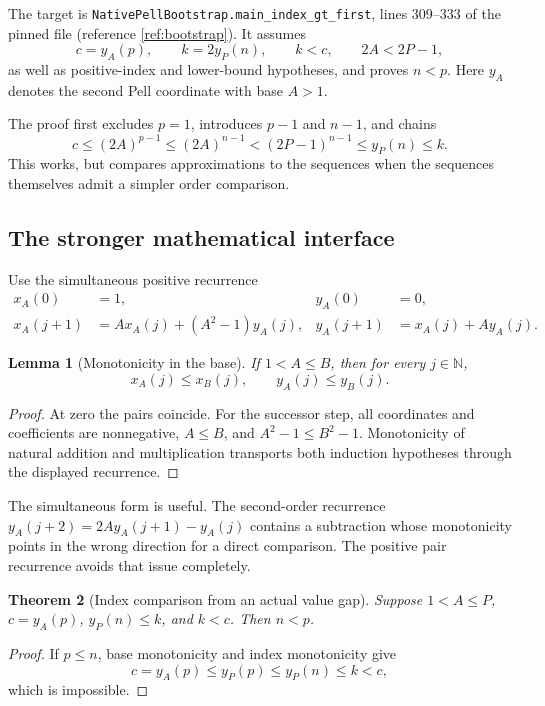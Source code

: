\documentclass[11pt,a4paper]{article}
\newcommand{\N}{\mathbb N}
\newcommand{\code}[1]{\nolinkurl{#1}}
\newtheorem{theorem}{Theorem}[section]
\newtheorem{lemma}[theorem]{Lemma}
\begin{document}
The target is \code{NativePellBootstrap.main_index_gt_first}, lines 309--333
of the pinned file (reference \ref{ref:bootstrap}). It assumes
\[
 c=y_A(p),\qquad k=2y_P(n),\qquad k<c,
 \qquad 2A<2P-1,
\]
as well as positive-index and lower-bound hypotheses, and proves \(n<p\).
Here \(y_A\) denotes the second Pell coordinate with base \(A>1\).

The proof first excludes \(p=1\), introduces \(p-1\) and \(n-1\), and chains
\[
 c\le (2A)^{p-1}\le (2A)^{n-1}
 <(2P-1)^{n-1}\le y_P(n)\le k.
\]
This works, but compares approximations to the sequences when the sequences
themselves admit a simpler order comparison.

\subsection{The stronger mathematical interface}

Use the simultaneous positive recurrence
\begin{align*}
 x_A(0)&=1,&y_A(0)&=0,\\
 x_A(j+1)&=A x_A(j)+(A^2-1)y_A(j),&
 y_A(j+1)&=x_A(j)+A y_A(j).
\end{align*}

\begin{lemma}[Monotonicity in the base]
If \(1<A\le B\), then for every \(j\in\N\),
\[
 x_A(j)\le x_B(j),\qquad y_A(j)\le y_B(j).
\]
\end{lemma}
\begin{proof}
At zero the pairs coincide. For the successor step, all coordinates and
coefficients are nonnegative, \(A\le B\), and \(A^2-1\le B^2-1\).
Monotonicity of natural addition and multiplication transports both induction
hypotheses through the displayed recurrence.
\end{proof}

The simultaneous form is useful. The second-order recurrence
\(y_A(j+2)=2A y_A(j+1)-y_A(j)\) contains a subtraction whose monotonicity points
in the wrong direction for a direct comparison. The positive pair recurrence
avoids that issue completely.

\begin{theorem}[Index comparison from an actual value gap]
Suppose \(1<A\le P\), \(c=y_A(p)\), \(y_P(n)\le k\), and \(k<c\).
Then \(n<p\).
\end{theorem}
\begin{proof}
If \(p\le n\), base monotonicity and index monotonicity give
\[
 c=y_A(p)\le y_P(p)\le y_P(n)\le k<c,
\]
which is impossible.
\end{proof}
\end{document}
